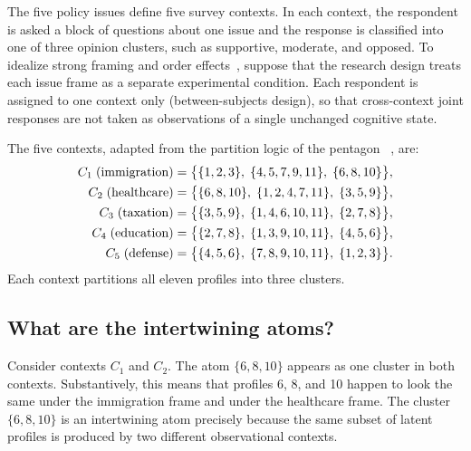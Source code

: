 \documentclass{article}
\begin{document}
The five policy issues define five survey contexts. In each context,
the respondent is asked a block of questions about one issue and the
response is classified into one of three opinion clusters, such as
supportive, moderate, and opposed. To idealize strong framing and
order effects~\cite{Moore2002}, suppose that the research design
treats each issue frame as a separate experimental condition. Each
respondent is assigned to one context only (between-subjects
design), so that cross-context joint responses are not taken as
observations of a single unchanged cognitive state.

The five contexts, adapted from the partition logic of the pentagon
~\cite{greechie-1974,wright:pent,svozil-2018-b}, are:
\begin{align}
C_1\;\text{(immigration)} &= \bigl\{\{1,2,3\},\;\{4,5,7,9,11\},\;
\{6,8,10\}\bigr\},
\notag\\
C_2\;\text{(healthcare)} &= \bigl\{\{6,8,10\},\;\{1,2,4,7,11\},\;
\{3,5,9\}\bigr\},
\notag\\
C_3\;\text{(taxation)} &= \bigl\{\{3,5,9\},\;\{1,4,6,10,11\},\;
\{2,7,8\}\bigr\},
\label{eq:pentagon}\\
C_4\;\text{(education)} &= \bigl\{\{2,7,8\},\;\{1,3,9,10,11\},\;
\{4,5,6\}\bigr\},
\notag\\
C_5\;\text{(defense)} &= \bigl\{\{4,5,6\},\;\{7,8,9,10,11\},\;
\{1,2,3\}\bigr\}.
\notag
\end{align}
Each context partitions all eleven profiles into three clusters.

\subsection{What are the intertwining atoms?}

Consider contexts $C_1$ and $C_2$. The atom $\{6,8,10\}$ appears as
one cluster in both contexts. Substantively, this means that profiles
6, 8, and 10 happen to look the same under the immigration frame and
under the healthcare frame. The cluster $\{6,8,10\}$ is an
intertwining atom precisely because the same subset of latent
profiles is produced by two different observational contexts.
\end{document}

